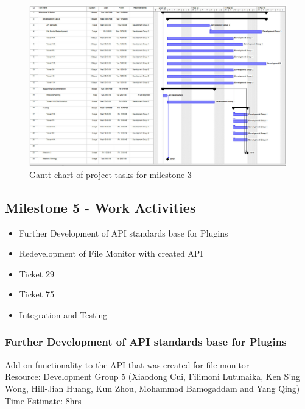 \documentclass{article}
\begin{document}
\begin{figure}[htp]
\begin{centering}
\includegraphics[angle=90,scale=0.5]{./schedule-milestone4.jpg} 
\par\end{centering}
\caption{Gantt chart of project tasks for milestone 3}
\label{fig:schedule3} 
\end{figure}

\newpage{}

\subsection{Milestone 5 - Work Activities}

\begin{itemize}
\item Further Development of API standards base for Plugins
\item Redevelopment of File Monitor with created API
\item Ticket 29
\item Ticket 75
\item Integration and Testing
\end{itemize}

\subsubsection{Further Development of API standards base for Plugins}
	Add on functionality to the API that was created for file monitor\\
	
	Resource: Development Group 5 (Xiaodong Cui, Filimoni Lutunaika, Ken S'ng Wong, Hill-Jian Huang, Kun Zhou, Mohammad Bamogaddam and Yang Qing)
	Time Estimate: 8hrs
\end{document}
